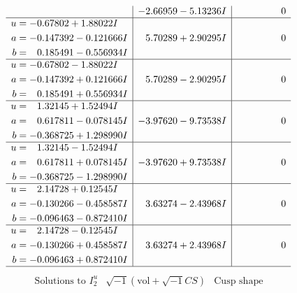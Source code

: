 \documentclass[1p]{elsarticle_modified}
\theoremstyle{definition}
\newcommand{\I}{\sqrt{-1}}
\begin{document}
$$\begin{array}{c|c|c}
 & -2.66959 - 5.13236 I & \phantom{-0.000000 } 0 \\ \hline\begin{aligned}
u &= -0.67802 + 1.88022 I \\
a &= -0.147392 - 0.121666 I \\
b &= \phantom{-}0.185491 - 0.556934 I\end{aligned}
 & \phantom{-}5.70289 + 2.90295 I & \phantom{-0.000000 } 0 \\ \hline\begin{aligned}
u &= -0.67802 - 1.88022 I \\
a &= -0.147392 + 0.121666 I \\
b &= \phantom{-}0.185491 + 0.556934 I\end{aligned}
 & \phantom{-}5.70289 - 2.90295 I & \phantom{-0.000000 } 0 \\ \hline\begin{aligned}
u &= \phantom{-}1.32145 + 1.52494 I \\
a &= \phantom{-}0.617811 - 0.078145 I \\
b &= -0.368725 + 1.298990 I\end{aligned}
 & -3.97620 - 9.73538 I & \phantom{-0.000000 } 0 \\ \hline\begin{aligned}
u &= \phantom{-}1.32145 - 1.52494 I \\
a &= \phantom{-}0.617811 + 0.078145 I \\
b &= -0.368725 - 1.298990 I\end{aligned}
 & -3.97620 + 9.73538 I & \phantom{-0.000000 } 0 \\ \hline\begin{aligned}
u &= \phantom{-}2.14728 + 0.12545 I \\
a &= -0.130266 - 0.458587 I \\
b &= -0.096463 - 0.872410 I\end{aligned}
 & \phantom{-}3.63274 - 2.43968 I & \phantom{-0.000000 } 0 \\ \hline\begin{aligned}
u &= \phantom{-}2.14728 - 0.12545 I \\
a &= -0.130266 + 0.458587 I \\
b &= -0.096463 + 0.872410 I\end{aligned}
 & \phantom{-}3.63274 + 2.43968 I & \phantom{-0.000000 } 0\\
 \hline 
 \end{array}$$\newpage$$\begin{array}{c|c|c}  
\text{Solutions to }I^u_{2}& \I (\text{vol} + \sqrt{-1}CS) & \text{Cusp shape}\\

\end{array}$$
\end{document}
